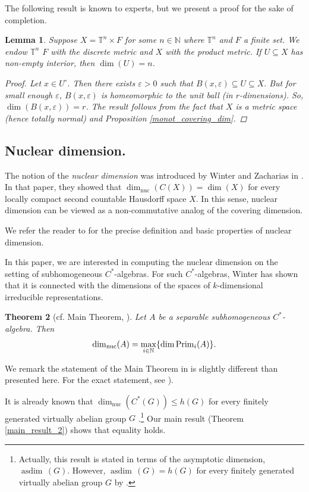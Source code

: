 \documentclass[11pt, twoside]{amsart}
\newcommand{\te}[1]{\operatorname{#1}}
\newcommand{\dimnuc }{\dim_{\operatorname{nuc}}}
\newtheorem{thm}{Theorem}[section]
\newtheorem{lemma}[thm]{Lemma}
\theoremstyle{definition}
\newcommand{\B}{\mathbb}
\newcommand{\N}{\B{N}}
\newcommand{\TT}{\mathbb{T}}
\begin{document}
The following result is known to experts, but we present a proof for the sake of completion.

 \begin{lemma}\label{non_empty_int_and_dimension}
     Suppose $X= \TT^n\times F$ for some $n\in \N$ where $\TT^n$ and $F$ a finite set. We endow $\TT^n$ $F$ with the discrete metric and $X$ with the product metric. If $U\subseteq X$ has non-empty interior, then $\dim(U)=n$.
     \begin{proof}
         Let $x\in U^{\circ}.$ Then there exists $\varepsilon>0$ such that $B(x,\varepsilon)\subseteq U \subseteq X.$ But for small enough $\varepsilon$, $B(x,\varepsilon)$ is homeomorphic to the unit ball (in $r$-dimensions). So, $\dim(B(x,\varepsilon))=r$. The result follows from the fact that $X$ is a metric space (hence totally normal) and Proposition \ref{monot_covering_dim}.
     \end{proof}
 \end{lemma}

 \subsection{Nuclear dimension.}
The notion of the {\em nuclear dimension} was introduced by Winter and Zacharias in \cite{WZ10}. In that paper, they showed that $\dimnuc (C(X))=\dim(X)$ for every locally compact second countable Hausdorff space $X$. In this sense, nuclear dimension can be viewed as a non-commutative analog of the covering dimension. 

We refer the reader to \cite{WZ10} for the precise definition and basic properties of nuclear dimension. \par
In this paper, we are interested in computing the nuclear dimension on the setting of subhomogeneous $C^*$-algebras. For such $C^*$-algebras, Winter has shown that it is connected with the dimensions of the spaces of $k$-dimensional irreducible representations.
\begin{thm}[cf. Main Theorem, \cite{Win04}]\label{dim_nuc_subhomogeneous}
 Let $A$ be a separable subhomogeneous $C^*$-algebra. Then 
\[\dimnuc (A)=\max_{i\in \N}\{\dim \textnormal{Prim}_i(A)\}.\]
 \end{thm}
We remark the statement of the Main Theorem in \cite{Win04} is slightly different than presented here. For the exact statement, see \cite[Thm. 2.6]{BL24}). \par

It is already known that $\dimnuc (C^*(G))\leq h(G)$ for every finitely generated virtually abelian group $G$ \cite[Prop. 2.14]{BL24}.\footnote{Actually, this result is stated in terms of the asymptotic dimension, $\te{asdim}\,(G)$. However, $\te{asdim}\,(G)=h(G)$ for every finitely generated virtually abelian group $G$ by \cite[Thm. 3.5]{asymp_dim_va_groups}.} Our main result (Theorem \ref{main_result_2}) shows that equality holds.
\end{document}
